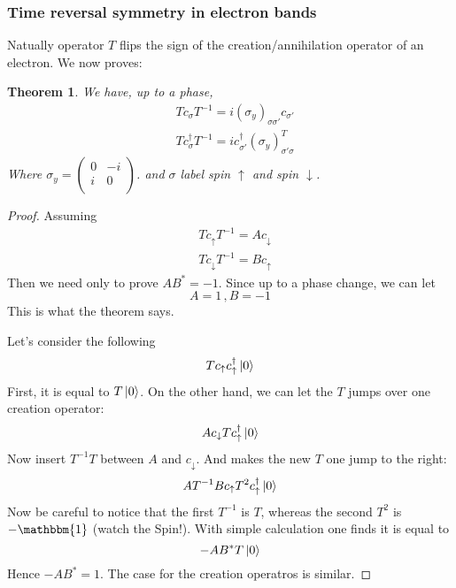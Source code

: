 \documentclass{article}
\numberwithin{equation}{subsection} %
\newtheorem{thm}{Theorem}[section]
\theoremstyle{definition}
\begin{document}
        \subsubsection{Time reversal symmetry in electron bands}
        \label{sec:Time-reversal-symmetry-in-electron-bands}
        Natually operator $T$ flips the sign of the
        creation/annihilation operator of an electron. We now proves:
        \begin{thm}
            We have, up to a phase,
            \begin{align}
                & T c_\sigma T^{-1} =
                i(\sigma_y)_{\sigma\sigma'}c_{\sigma'} \\
                & T c_\sigma^\dagger T^{-1} = 
                ic_{\sigma'}^\dagger(\sigma_y)^T_{\sigma'\sigma}
            \end{align}
            Where $\sigma_y = \left( \begin{array}{cc}
                         0 & -i \\
                         i & 0 \\ \end{array} \right)$.
            and $\sigma$ label spin $\uparrow$ and spin
            $\downarrow$.
        \end{thm}
        \begin{proof}
            Assuming
            \begin{align}
                & Tc_\uparrow T^{-1} = A c_\downarrow \\
                & Tc_\downarrow T^{-1} = B c_\uparrow
            \end{align}
            Then we need only to prove $AB^* = -1$. Since up to a
            phase change, we can let
            \begin{equation}
                A = 1\,, B = -1
            \end{equation}
            This is what the theorem says.

            Let's consider the following
            $$T c_\uparrow c_\uparrow^\dagger \ket{0}$$
            First, it is equal to $T\ket{0}$. On the other hand, we
            can let the $T$ jumps over one creation operator:
            $$A c_\downarrow T c_\uparrow^\dagger \ket{0}$$
            Now insert $T^{-1}T$ between $A$ and $c_\downarrow$. And
            makes the new $T$ one jump to the right:\
            $$ A T^{-1} B c_\uparrow T^2 c_\uparrow^\dagger \ket{0}$$
            Now be careful to notice that the first $T^{-1}$ is $T$,
            whereas the second $T^2$ is $- \mathbbm{1}$ (watch the
            Spin!). With simple calculation one finds it is equal to
            $$ -AB^* T\ket{0}$$
            Hence $-AB^* = 1$. The case for the creation operatros is
            similar.
        \end{proof}
\end{document}
